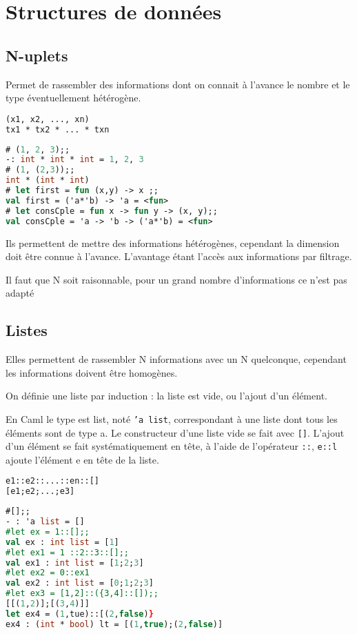 \chapter{Structures de données}
\section{N-uplets}
Permet de rassembler des informations dont on connait à l'avance le nombre et le type éventuellement hétérogène.
	\begin{lstlisting}[language=Caml, caption=Syntaxe de n-uplets, numbers=none]
(x1, x2, ..., xn)		
tx1 * tx2 * ... * txn
\end{lstlisting}

\begin{exemple}
	\begin{lstlisting}[language=Caml, caption=Exemple n-uplets, numbers=none, framerule=0pt]
# (1, 2, 3);;
-: int * int * int = 1, 2, 3
# (1, (2,3));; 
int * (int * int)
# let first = fun (x,y) -> x ;;
val first = ('a*'b) -> 'a = <fun>
# let consCple = fun x -> fun y -> (x, y);;
val consCple = 'a -> 'b -> ('a*'b) = <fun>
\end{lstlisting}
\end{exemple}

Ils permettent de mettre des informations hétérogènes, cependant la dimension doit être connue à l'avance. L'avantage étant l'accès aux informations
par filtrage.

Il faut que N soit raisonnable, pour un grand nombre d'informations ce n'est pas adapté

\section{Listes}
Elles permettent de rassembler N informations avec un N quelconque, cependant les informations doivent être homogènes.

On définie une liste par induction : la liste est vide, ou l'ajout d'un élément.

En Caml le type est list, noté \texttt{'a list}, correspondant à une liste dont tous les éléments sont de type a. Le constructeur d'une liste vide se
fait avec \texttt{[]}.  L'ajout d'un élément se fait systématiquement en tête, à l'aide de l'opérateur \texttt{::}, \texttt{e::l} ajoute l'élément e en tête de la liste.

	\begin{lstlisting}[language=Caml, numbers=none, framerule=0pt]
e1::e2::...::en::[]	
[e1;e2;...;e3]
	\end{lstlisting}
	\begin{exemple}
	\begin{lstlisting}[language=Caml, caption=Exemple de listes, numbers=none, framerule=0pt]
#[];;
- : 'a list = []
#let ex = 1::[];;
val ex : int list = [1]
#let ex1 = 1 ::2::3::[];;
val ex1 : int list = [1;2;3]
#let ex2 = 0::ex1
val ex2 : int list = [0;1;2;3]
#let ex3 = [1,2]::({3,4]::[]);;
[[(1,2)];[(3,4)]]
let ex4 = (1,tue)::[(2,false)}
ex4 : (int * bool) lt = [(1,true);(2,false)]
	\end{lstlisting}
	\end{exemple}

